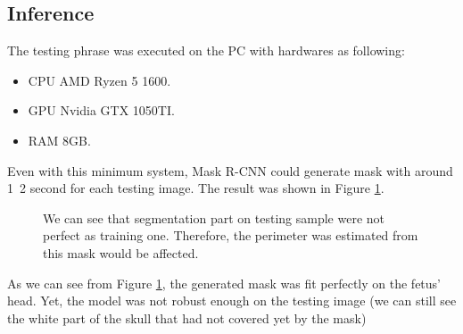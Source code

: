 \subsection{Inference}
\label{subsection:mrcnn_inference}
\noindent
	
	The testing phrase was executed on the PC with hardwares as following:
	
	\begin{itemize}
		\item CPU AMD Ryzen 5 1600.
		\item GPU Nvidia GTX 1050TI.
		\item RAM 8GB.
	\end{itemize}
	
	Even with this minimum system, Mask R-CNN could generate mask with around 1~2 second for each testing image. The result was shown in Figure \ref{fig:train_test_result}.
	
	\begin{figure}[H]
		\centering
		\hfill %
		\hfill %
		\caption{We can see that segmentation part on testing sample were not perfect as training one. Therefore, the perimeter was estimated from this mask would be affected.}
		\label{fig:train_test_result}
	\end{figure}
	
	As we can see from Figure \ref{fig:train_test_result}, the generated mask was fit perfectly on the fetus' head. Yet, the model was not robust enough on the testing image (we can still see the white part of the skull that had not covered yet by the mask)
	
